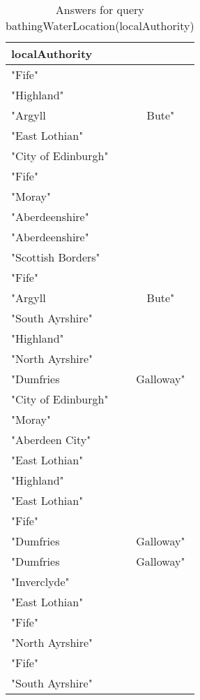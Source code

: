 \documentclass[a4paper,10pt]{article}
\begin{document}
\begin{table}[!tb]
\caption{Answers for query bathingWaterLocation(localAuthority) }	
\begin{center}	
\begin{tabular}{ l c}
\hline
localAuthority  \\ \hline
"Fife"                \\
 "Highland"            \\
 "Argyll & Bute"	\\
 "East Lothian"        \\
 "City of Edinburgh"   \\
 "Fife"                \\
 "Moray"               \\
"Aberdeenshire"	\\
 "Aberdeenshire"	\\
 "Scottish Borders"    \\
 "Fife"                \\
 "Argyll & Bute"	\\
 "South Ayrshire"	\\
 "Highland"            \\
 "North Ayrshire"	\\
"Dumfries & Galloway" \\
 "City of Edinburgh"   \\
"Moray"               \\
 "Aberdeen City"	\\
 "East Lothian"        \\
 "Highland"            \\
 "East Lothian"        \\
 "Fife"                \\
 "Dumfries & Galloway" \\
 "Dumfries & Galloway" \\
 "Inverclyde"          \\
 "East Lothian"        \\
 "Fife"                \\
 "North Ayrshire"	\\
 "Fife"                \\
 "South Ayrshire"	


\end{tabular}
\label{bathingWaterLocation(localAuthority)}
\end{center}
\end{table}
\end{document}
